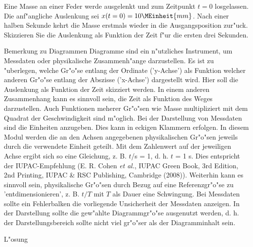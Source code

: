 \begin{MExercises}
\begin{MExercise}
Eine Masse an einer Feder werde ausgelenkt und zum Zeitpunkt $t=0$ losgelassen. Die anf"angliche Auslenkung sei $x(t=0)=10\MEinheit{mm}$. Nach einer halben Sekunde kehrt die Masse erstmals wieder in die Ausgangsposition zur"uck. Skizzieren Sie die Auslenkung als Funktion der Zeit f"ur die ersten drei Sekunden.

  \begin{MHint}{Bemerkung zu Diagrammen}
  Diagramme sind ein n"utzliches Instrument, um Messdaten oder physikalische Zusammenh"ange darzustellen. Es ist zu "uberlegen, welche Gr"o"se entlang der Ordinate ('y-Achse') als Funktion welcher anderen Gr"o"se entlang der Abszisse ('x-Achse') dargestellt wird. Hier soll die Auslenkung als Funktion der Zeit skizziert werden. In einem anderen Zusammenhang kann es sinnvoll sein, die Zeit als Funktion des Weges darzustellen. Auch Funktionen meherer Gr"o"sen wie Masse multipliziert mit dem Quadrat der Geschwindigkeit sind m"oglich. Bei der Darstellung von Messdaten sind die Einheiten anzugeben. Dies kann in eckigen Klammern erfolgen. In diesem Modul werden die an den Achsen angegebenen physikalischen Gr"o"sen jeweils durch die verwendete Einheit geteilt. Mit dem Zahlenwert auf der jeweiligen Achse ergibt sich so eine Gleichung, z. B. $t$/s = 1, d. h. $t$ = 1 s. Dies entspricht der IUPAC-Empfehlung (E. R. Cohen \textit{et al.}, IUPAC Green Book, 3rd Edition, 2nd Printing, IUPAC \& RSC Publishing, Cambridge (2008)). Weiterhin kann es sinnvoll sein, physikalische Gr"o"sen durch Bezug auf eine Referenzgr"o"se zu 'entdimensionieren', z. B. $t/T$ mit $T$ als Dauer eine Schwingung. Bei Messdaten sollte ein Fehlerbalken die vorliegende Unsicherheit der Messdaten anzeigen. In der Darstellung sollte die gew"ahlte Diagrammgr"o"se ausgenutzt werden, d. h. der Darstellungsbereich sollte nicht viel gr"o"ser als der Diagramminhalt sein.
  \end{MHint}


\begin{MHint}{L"osung}
\begin{center}
  \end{center}
\end{MHint}


\end{MExercise}
\end{MExercises}

